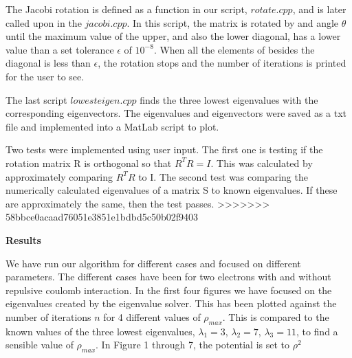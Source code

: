 \documentclass[10pt,a4paper]{article}
\begin{document}
\noindent The Jacobi rotation is defined as a function in our script, $rotate.cpp$, and is later called upon in the $jacobi.cpp$. In this script, the matrix is rotated by and angle $\theta$ until the maximum value of the upper, and also the lower diagonal, has a lower value than a set tolerance $\epsilon$ of $10^{-8}$. When all the elements of besides the diagonal is less than $\epsilon$, the rotation stops and the number of iterations is printed for the user to see. 

\noindent The last script $lowesteigen.cpp$ finds the three lowest eigenvalues with the corresponding eigenvectors. The eigenvalues and eigenvectors were saved as a txt file and implemented into a MatLab script to plot.

\noindent Two tests were implemented using user input. The first one is testing if the rotation matrix R is orthogonal so that $R^{T}R = I$. This was calculated by approximately comparing $R^{T}R$ to I. The second test was comparing the numerically calculated eigenvalues of a matrix S to known eigenvalues. If these are approximately the same, then the test passes.
>>>>>>> 58bbce0acaad76051e3851e1bdbd5c50b02f9403


\newpage

\begin{center}
{\LARGE\bf Results}
\end{center}
We have run our algorithm for different cases and focused on different parameters. The different cases have been for two electrons with and without repulsive coulomb interaction. In the first four figures we have focused on the eigenvalues created by the eigenvalue solver. This has been plotted against the number of iterations $n$ for 4 different values of ${\rho}_{max}$. This is compared to the known values of the three lowest eigenvalues, $\lambda_1=3$, $\lambda_2=7$, $\lambda_3=11$, to find a sensible value of ${\rho}_{max}$. In Figure 1 through 7, the potential is set to $\rho^2$
\end{document}
